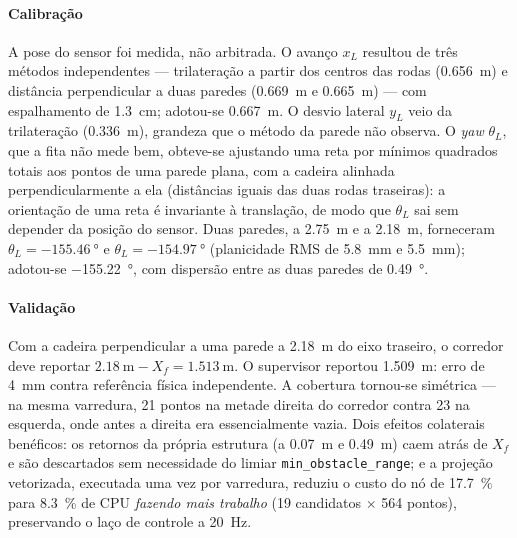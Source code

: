 \documentclass[conference]{IEEEtran}
\begin{document}
\paragraph{Calibração} A pose do sensor foi medida, não arbitrada. O avanço
$x_L$ resultou de três métodos independentes --- trilateração a partir dos
centros das rodas (\SI{0.656}{\metre}) e distância perpendicular a duas paredes
(\SI{0.669}{\metre} e \SI{0.665}{\metre}) --- com espalhamento de
\SI{1.3}{\centi\metre}; adotou-se \SI{0.667}{\metre}. O desvio lateral $y_L$ veio
da trilateração (\SI{0.336}{\metre}), grandeza que o método da parede não observa.
O \emph{yaw} $\theta_L$, que a fita não mede bem, obteve-se ajustando uma reta por
mínimos quadrados totais aos pontos de uma parede plana, com a cadeira alinhada
perpendicularmente a ela (distâncias iguais das duas rodas traseiras): a
orientação de uma reta é invariante à translação, de modo que $\theta_L$ sai
sem depender da posição do sensor. Duas paredes, a \SI{2.75}{\metre} e a
\SI{2.18}{\metre}, forneceram $\theta_L=\SI{-155.46}{\degree}$ e
$\theta_L=\SI{-154.97}{\degree}$ (planicidade RMS de \SI{5.8}{\milli\metre} e
\SI{5.5}{\milli\metre}); adotou-se \SI{-155.22}{\degree}, com dispersão entre as
duas paredes de \SI{0.49}{\degree}.

\paragraph{Validação} Com a cadeira perpendicular a uma parede a
\SI{2.18}{\metre} do eixo traseiro, o corredor deve reportar
$\SI{2.18}{\metre}-X_f=\SI{1.513}{\metre}$. O supervisor reportou
\SI{1.509}{\metre}: erro de \SI{4}{\milli\metre} contra referência física
independente. A cobertura tornou-se simétrica --- na mesma varredura, \num{21}
pontos na metade direita do corredor contra \num{23} na esquerda, onde antes a
direita era essencialmente vazia. Dois efeitos colaterais benéficos: os retornos
da própria estrutura (a \SI{0.07}{\metre} e \SI{0.49}{\metre}) caem atrás de
$X_f$ e são descartados sem necessidade do limiar \texttt{min\_obstacle\_range};
e a projeção vetorizada, executada uma vez por varredura, reduziu o custo do nó
de \SI{17.7}{\percent} para \SI{8.3}{\percent} de CPU \emph{fazendo mais
trabalho} (\num{19} candidatos $\times$ \num{564} pontos), preservando o laço de
controle a \SI{20}{\hertz}.
\end{document}
